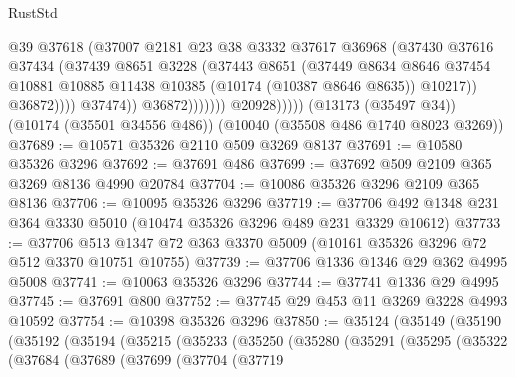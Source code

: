 \begin{lexlean}{RustStd}
\begin{coremodule}
                                  @39
                                  @37618
                                  (@37007
                                    @2181
                                    @23
                                    @38
                                    @3332
                                    @37617
                                    @36968
                                    (@37430
                                      @37616
                                      @37434
                                      (@37439
                                        @8651
                                        @3228
                                        (@37443
                                          @8651
                                          (@37449
                                            @8634
                                            @8646
                                            @37454
                                            @10881
                                            @10885
                                            @11438
                                            @10385
                                            (@10174 (@10387 @8646 @8635))
                                            @10217))
                                        @36872))))
                                @37474))
                            @36872)))))))
              @20928)))))
    (@13173 (@35497 @34))
    (@10174 (@35501 @34556 @486))
    (@10040 (@35508 @486 @1740 @8023 @3269))
@37689 := @10571 @35326 @2110 @509 @3269 @8137
@37691 := @10580 @35326 @3296
@37692 := @37691 @486
@37699 := @37692 @509 @2109 @365 @3269 @8136 @4990 @20784
@37704 := @10086 @35326 @3296 @2109 @365 @8136
@37706 := @10095 @35326 @3296
@37719 := @37706 @492 @1348 @231 @364 @3330 @5010 (@10474 @35326 @3296 @489 @231 @3329 @10612)
@37733 := @37706 @513 @1347 @72 @363 @3370 @5009 (@10161 @35326 @3296 @72 @512 @3370 @10751 @10755)
@37739 := @37706 @1336 @1346 @29 @362 @4995 @5008
@37741 := @10063 @35326 @3296
@37744 := @37741 @1336 @29 @4995
@37745 := @37691 @800
@37752 := @37745 @29 @453 @11 @3269 @3228 @4993 @10592
@37754 := @10398 @35326 @3296
@37850 := @35124
    (@35149
      (@35190
        (@35192
          (@35194
            (@35215
              (@35233
                (@35250
                  (@35280
                    (@35291
                      (@35295
                        (@35322
                          (@37684
                            (@37689
                              (@37699
                                (@37704
                                  (@37719

\end{coremodule}
\end{lexlean}
